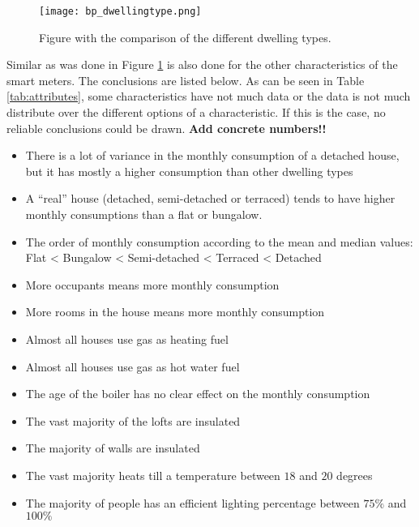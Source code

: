 
\begin{figure}[h!]
	\centering
	\texttt{[image: bp\_dwellingtype.png]}
	\caption{Figure with the comparison of the different dwelling types.}
	\label{fig:bp_dwellingtype}
\end{figure}





Similar as was done in Figure \ref{fig:bp_dwellingtype} is also done for the other characteristics of the smart meters. The conclusions are listed below. As can be seen in Table \ref{tab:attributes}, some characteristics have not much data or the data is not much distribute over the different options of a characteristic. If this is the case, no reliable conclusions could be drawn. \textbf{Add concrete numbers!!}

\begin{itemize}
	\item There is a lot of variance in the monthly consumption of a detached house, but it has mostly a higher consumption than other dwelling types
	\item A ``real'' house (detached, semi-detached or terraced) tends to have higher monthly consumptions than a flat or bungalow.  
	\item The order of monthly consumption according to the mean and median values: Flat < Bungalow < Semi-detached < Terraced < Detached
	\item More occupants means more monthly consumption
	\item More rooms in the house means more monthly consumption
	\item Almost all houses use gas as heating fuel
	\item Almost all houses use gas as hot water fuel
	\item The age of the boiler has no clear effect on the monthly consumption
	\item The vast majority of the lofts are insulated
	\item The majority of walls are insulated
	\item The vast majority heats till a temperature between $ 18 $ and $ 20  $ degrees
	\item The majority of people has an efficient lighting percentage between $ 75\% $ and $ 100\% $
	
\end{itemize}



